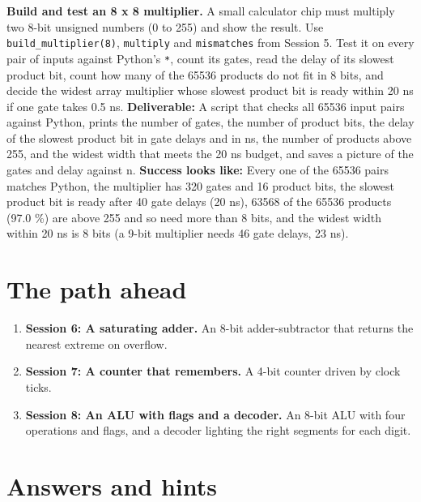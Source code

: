 \documentclass[11pt,a4paper]{article}
\begin{document}
\textbf{Build and test an 8 x 8 multiplier.} A small calculator chip must multiply two 8-bit unsigned numbers (0 to 255) and show the result. Use \texttt{build\_multiplier(8)}, \texttt{multiply} and \texttt{mismatches} from Session 5. Test it on every pair of inputs against Python's \texttt{*}, count its gates, read the delay of its slowest product bit, count how many of the 65536 products do not fit in 8 bits, and decide the widest array multiplier whose slowest product bit is ready within 20 ns if one gate takes 0.5 ns. \textbf{Deliverable:} A script that checks all 65536 input pairs against Python, prints the number of gates, the number of product bits, the delay of the slowest product bit in gate delays and in ns, the number of products above 255, and the widest width that meets the 20 ns budget, and saves a picture of the gates and delay against n. \textbf{Success looks like:} Every one of the 65536 pairs matches Python, the multiplier has 320 gates and 16 product bits, the slowest product bit is ready after 40 gate delays (20 ns), 63568 of the 65536 products (97.0 \%) are above 255 and so need more than 8 bits, and the widest width within 20 ns is 8 bits (a 9-bit multiplier needs 46 gate delays, 23 ns).

\section{The path ahead}
\begin{enumerate}[nosep]
\item \textbf{Session 6: A saturating adder.} An 8-bit adder-subtractor that returns the nearest extreme on overflow.
\item \textbf{Session 7: A counter that remembers.} A 4-bit counter driven by clock ticks.
\item \textbf{Session 8: An ALU with flags and a decoder.} An 8-bit ALU with four operations and flags, and a decoder lighting the right segments for each digit.
\end{enumerate}

\section{Answers and hints}
\end{document}
